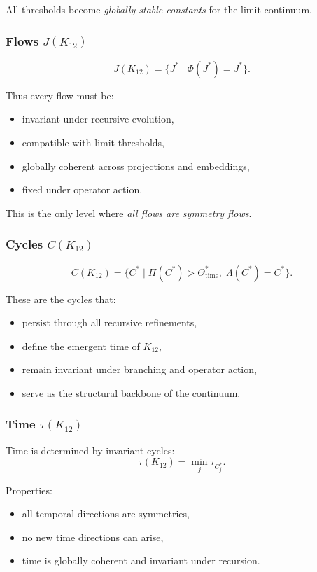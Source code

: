 All thresholds become \emph{globally stable constants} for the limit continuum.

\subsubsection{Flows $J(K_{12})$}

\[
J(K_{12}) = \{J^*\mid \Phi(J^*)=J^*\}.
\]

Thus every flow must be:
\begin{itemize}
    \item invariant under recursive evolution,
    \item compatible with limit thresholds,
    \item globally coherent across projections and embeddings,
    \item fixed under operator action.
\end{itemize}

This is the only level where \emph{all flows are symmetry flows}.

\subsubsection{Cycles $C(K_{12})$}

\[
C(K_{12}) = \{ C^*\mid \Pi(C^*)>\Theta_{\mathrm{time}}^*,\;
\Lambda(C^*)=C^*\}.
\]

These are the cycles that:
\begin{itemize}
    \item persist through all recursive refinements,
    \item define the emergent time of $K_{12}$,
    \item remain invariant under branching and operator action,
    \item serve as the structural backbone of the continuum.
\end{itemize}

\subsubsection{Time $\tau(K_{12})$}

Time is determined by invariant cycles:
\[
\tau(K_{12}) = \min_j \tau_{C_j^*}.
\]

Properties:
\begin{itemize}
    \item all temporal directions are symmetries,
    \item no new time directions can arise,
    \item time is globally coherent and invariant under recursion.
\end{itemize}

